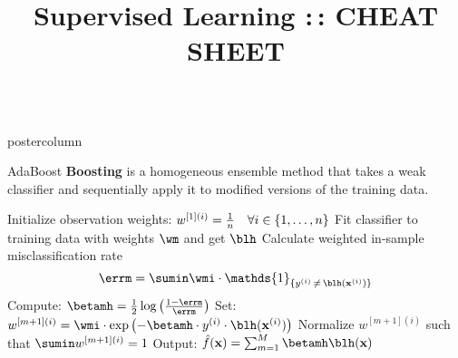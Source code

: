 \documentclass{beamer}
\title{Supervised Learning :\,: CHEAT SHEET} %
\newlength{\columnheight} %
\begin{document}
\begin{frame}[fragile]{}
\begin{columns}
	\begin{column}{.31\textwidth}
		\begin{beamercolorbox}[center]{postercolumn}
			\begin{minipage}{.98\textwidth}
				\parbox[t][\columnheight]{\textwidth}{

					\begin{myblock}{AdaBoost}
						\textbf{Boosting} is a homogeneous ensemble method that takes a weak classifier and sequentially apply it to modified versions of the training data.


							\begin{algorithm}[H]
								\begin{algorithmic}[1]
									\State Initialize observation weights: $w^{[1](i)} = \frac{1}{n} \quad \forall i \in \{1, \ldots, n\}$
									\State Fit classifier to training data with weights $\wm$ and get $\blh$
									\State Calculate weighted in-sample misclassification rate
									$$
									\errm = \sumin \wmi \cdot \mathds{1}_{\{\yi \,\neq\, \blh(\xi)\}}
									$$
									\State Compute: $ \betamh = \frac{1}{2} \log \left( \frac{1 - \errm}{\errm}\right)$
									\State Set: $w^{[m+1](i)} = \wmi \cdot \exp\left(- \betamh \cdot
									\yi \cdot \blh(\xi)\right) $
									\State Normalize $w^{[m+1](i)}$ such that $\sumin w^{[m+1](i)} = 1$
									\EndFor
									\State Output: $\fxh = \sum_{m=1}^{M} \betamh \blh(\xv)$
								\end{algorithmic}
								\caption{AdaBoost $\Yspace = \setmp$}
							\end{algorithm}
							
\\


\end{myblock}}
\end{minipage}
\end{beamercolorbox}
\end{column}
\end{columns}
\end{frame}
\end{document}
